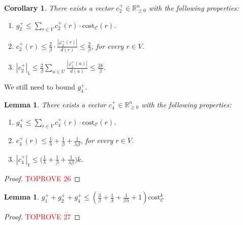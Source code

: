 \documentclass[11pt]{article}
\newcommand{\R}{\mathbb{R}}
\newcommand{\cost}{\mathrm{cost}}
\newtheorem{lemma}[theorem]{Lemma}
\newtheorem{coro}[theorem]{Corollary}
\newcommand{\calC}{{\mathcal{C}}}
\begin{document}
\begin{CJK*}{UTF8}{gbsn}
\begin{coro}
    \label{coro:g+2}
    There exists a vector $c^+_2 \in \R_{\geq 0}^{n}$ with the following properties:
    \begin{enumerate}[label=(\ref{coro:g+2}\alph*)]
        \item \label{property:g+2-cost} $g^+_2 \leq \sum_{r \in V}c^+_2(r)\cdot \cost_\calC(r)$.
        \item \label{property:g+2-c+2-infty} $c^+_2(r) \leq \frac{2}{\beta} \cdot \frac{|\varphi^+_2(r)|}{d(r)} \leq \frac{2}{\beta}$, for every $r \in V$.
        \item \label{property:g+2-c+2-1} $|c^+_2|_1 \leq \frac2\beta\sum_{u \in U}\frac{|\varphi^+_2(u)|}{d(u)} \leq \frac{2k}{\beta}$.
    \end{enumerate}
\end{coro}

We still need to bound $g^+_4$.

\begin{lemma}
    \label{lemma:g+3}
    There exists a vector $c^+_4 \in \R_{\geq 0}^{n}$ with the following properties:
    \begin{enumerate}[label=(\ref{lemma:g+3}\alph*)]
        \item \label{property:g+3-cost} $g^+_4 \leq \sum_{r \in V}c^+_4(r)\cdot \cost_\calC(r)$.
        \item \label{property:g+3-c+3-infty} $c^+_4(r) \leq  \frac{1}{\lambda} + \frac{1}{\beta} + \frac{1}{\lambda\beta} $, for every $r \in V$.
        \item \label{property:g+3-c+3-1} $|c^+_4|_1 \leq \big( \frac{1}{\lambda} + \frac{1}{\beta} + \frac{1}{\lambda\beta} \big)k$.
    \end{enumerate}
\end{lemma}








\begin{proof}\textcolor{red}{TOPROVE 26}\end{proof}

\begin{lemma}
\label{lemma:g+1+2+3}
$g^+_1 + g^+_2 + g^+_4 \leq (\frac{3}{\beta} + \frac{1}{\lambda} + \frac{1}{\beta\lambda} + 1)\cost^k_{\calC}$
\end{lemma}
\begin{proof}\textcolor{red}{TOPROVE 27}\end{proof}


\end{CJK*}
\end{document}

